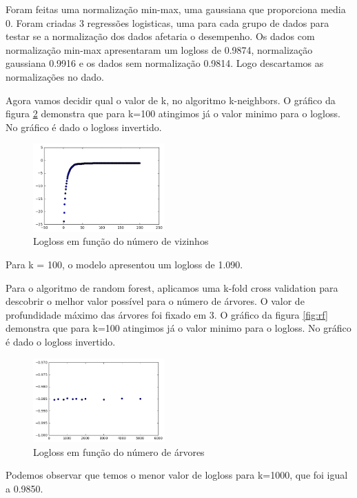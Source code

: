 \documentclass{article}
\begin{document}
Foram feitas uma normalização min-max, uma gaussiana que proporciona media 0. Foram criadas 3 regressões logisticas, uma para cada grupo de dados para testar se a normalização dos dados afetaria o desempenho. Os dados com normalização min-max apresentaram um logloss de 0.9874, normalização gaussiana 0.9916 e os dados sem normalização 0.9814. Logo descartamos as normalizações no dado.

Agora vamos decidir qual o valor de k, no algoritmo k-neighbors. O gráfico da figura \ref{fig:knn} demonstra que para k=100 atingimos já o valor minimo para o logloss. No gráfico é dado o logloss invertido.

\begin{figure}[!h]
	\centering
	\includegraphics[width=0.45\textwidth]{./04-figuras/knn_k.png}
	\caption{Logloss em função do número de vizinhos}
	\label{fig:knn}
\end{figure}
 Para k = 100, o modelo apresentou um logloss de 1.090.
 
 Para o algoritmo de random forest, aplicamos uma k-fold cross validation para descobrir o melhor valor possível para o número de árvores. O valor de profundidade máximo das árvores foi fixado em 3. O gráfico da figura \ref{fig:rf} demonstra que para k=100 atingimos já o valor minimo para o logloss. No gráfico é dado o logloss invertido.
 
\begin{figure}[!h]
	\centering
	\includegraphics[width=0.45\textwidth]{./04-figuras/random_k.png}
	\caption{Logloss em função do número de árvores}
	\label{fig:knn}
\end{figure}

Podemos observar que temos o menor valor de logloss para k=1000, que foi igual a 0.9850.
\end{document}
